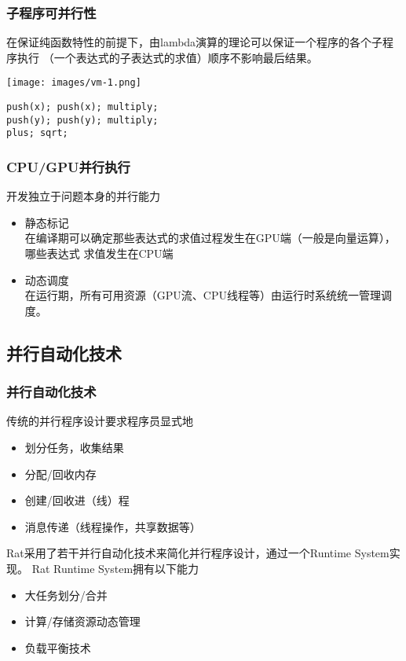 \documentclass{beamer}
\begin{document}
\begin{frame}
  \frametitle{子程序可并行性}
  在保证纯函数特性的前提下，由lambda演算的理论可以保证一个程序的各个子程序执行
  （一个表达式的子表达式的求值）顺序不影响最后结果。
  \pause

  \texttt{[image: images/vm-1.png]}
  \pause

  \texttt{push(x); push(x); multiply;\\}\pause
  \texttt{push(y); push(y); multiply;\\}\pause
  \texttt{plus; sqrt;}
\end{frame}

\begin{frame}
  \frametitle{CPU/GPU并行执行}
  开发独立于问题本身的并行能力
  \begin{itemize}
    \item 静态标记\\
      在编译期可以确定那些表达式的求值过程发生在GPU端（一般是向量运算），哪些表达式
      求值发生在CPU端
    \item 动态调度\\
      在运行期，所有可用资源（GPU流、CPU线程等）由运行时系统统一管理调度。
  \end{itemize}
\end{frame}

\subsection{并行自动化技术}

\begin{frame}
  \frametitle{并行自动化技术}
  传统的并行程序设计要求程序员显式地
  \begin{itemize}
    \item 划分任务，收集结果
    \item 分配/回收内存
    \item 创建/回收进（线）程
    \item 消息传递（线程操作，共享数据等）
  \end{itemize}
  \pause
  Rat采用了若干并行自动化技术来简化并行程序设计，通过一个Runtime System实现。
  Rat Runtime System拥有以下能力
  \begin{itemize}
    \item 大任务划分/合并
    \item 计算/存储资源动态管理
    \item 负载平衡技术
  \end{itemize}
\end{frame}
\end{document}
